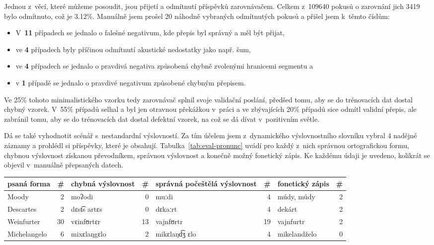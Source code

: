 Jednou z~věcí, které můžeme posoudit, jsou přijetí a odmítnutí příspěvků
zarovnávačem. Celkem z~109640 pokusů o zarovnání jich 3419 bylo odmítnuto, což
je 3.12\%. Manuálně jsem prošel 20 náhodně vybraných odmítnutých pokusů a
přišel jsem k~těmto číslům:
\begin{itemize}
\item{
    V~\textbf{11} případech se jednalo o falešné negativum, kde přepis byl
    správný a měl být přijat,
}
\item{
    ve \textbf{4} případech byly příčinou odmítnutí akustické nedostatky jako
    např. šum,
}
\item{
    ve \textbf{4} případech se jednalo o pravdivá negativa způsobená chybně
    zvolenými hranicemi segmentu a
}
\item{
     v \textbf{1} případě se jednalo o pravdivé negativum způsobené chybným
    přepisem.
}
\end{itemize}

Ve 25\% tohoto minimalistického vzorku tedy zarovnávač splnil svoje validační
poslání, předšed tomu, aby se do trénovacích dat dostal chybný vzorek. V~55\%
případů selhal a byl jen otravnou překážkou v~práci a ve zbývajících 20\%
případů sice odmítl validní přepis, ale zabránil tomu, aby se do trénovacích dat
dostal defektní vzorek, na což se dá dívat v~pozitivním světle.

Dá se také vyhodnotit scénář s~nestandardní výslovností. Za tím účelem jsem
z~dynamického výslovnostního slovníku vybral 4 nadějné záznamy a prohlédl si
příspěvky, které je obsahují. Tabulka~\ref{tab:eval-pronunc} uvádí pro každý
z~nich správnou ortografickou formu, chybnou výslovnost získanou převodníkem,
správnou výslovnost a konečně možný fonetický zápis. Ke každému údaji je uvedeno,
kolikrát se objevil v~manuálně přepsaných datech.

\begin{table*}[htpb]
\begin{center}
\begin{tabular}{|l r|l r|l r|l r|}
\hline
psaná forma                     & \#
    & chybná výslovnost             & \#
        & správná počeštělá výslovnost  & \#
            & fonetický zápis               & \# \\
\hline
Moody & 2 & moʔodi & 0 & muːdi & 4 & múdy, můdy & 2 \\
Descartes & 2 & dɛst͡s artɛs  & 0 & dɛkaːrt & 4 & dekárt & 2   \\
Weinfurter & 30 & vɛinfʊrtɛr & 13 & vajnfʊrtr & 19 & vajnfurtr & 2 \\
Michelangelo & 6 & mixɛlaŋgɛlo & 2 & mikɛlaŋd͡ʒ ɛlo  & 4 & mikelandželo & 0 \\
\hline
\end{tabular}
\caption{Příklady nestandardní výslovnosti v~manuálních přepisech}
\label{tab:eval-pronunc}
\end{center}
\end{table*}

